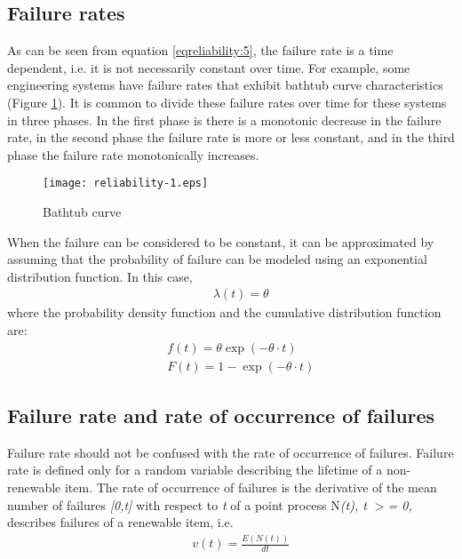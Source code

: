 \subsection{Failure rates}
As can be seen from equation \eqref{eqreliability:5}, the failure rate is a time dependent, i.e. it
is not necessarily constant over time. For example, some engineering systems have
failure rates that exhibit bathtub curve characteristics (Figure \ref{reliability:1}).
It is common to divide these failure rates over time for these systems in three
phases. In the first phase is there is a monotonic decrease in the failure rate,
in the second phase the failure rate is more or less constant, and in the third
phase the failure rate monotonically increases.
\begin{figure}[h]
\texttt{[image: reliability-1.eps]}
\caption{Bathtub curve}\label{reliability:1}
\end{figure}
When the failure can be considered to be constant, it can be approximated by
assuming that the probability of failure can be modeled using an exponential
distribution function. In this case,
\begin{eqnarray}
&& \lambda (t) = \theta 
\end{eqnarray}
where the probability density function and the cumulative distribution function
are:
\begin{eqnarray}
&& f(t) = \theta \exp ( - \theta  \cdot t) \\ 
&& F(t) = 1- \exp ( - \theta  \cdot t)
\end{eqnarray}
\subsection{Failure rate and rate of occurrence of failures}
Failure rate should not be confused with the rate of occurrence of failures.
Failure rate is defined only for a random variable describing the lifetime of a
non-renewable item. The rate of occurrence of failures is the derivative of the
mean number of failures \textit{[0,t]} with respect to \textit{t} of a point
process N\textit{(t), t $>$= 0,} describes failures of a renewable item, i.e.
\begin{eqnarray}
&& v(t)=\frac{E\left( N(t) \right)}{dt} \label{eqreliability:6}
\end{eqnarray}
